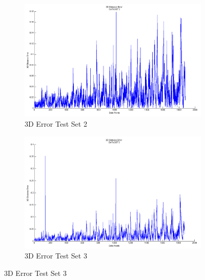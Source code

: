 \documentclass[a4paper]{IEEEtran}
\begin{document}
\begin{figure}%
\centering
\begin{subfigure}{\columnwidth}
\includegraphics[width=\columnwidth]{T2}%
\caption{3D Error Test Set 2}%
\label{subfiga}%
\end{subfigure}\hfill%
\begin{subfigure}{\columnwidth}
\includegraphics[width=\columnwidth]{T3}%
\caption{3D Error Test Set 3}%
\label{subfiga}%
\end{subfigure}\hfill%
\end{figure}
\end{document}
